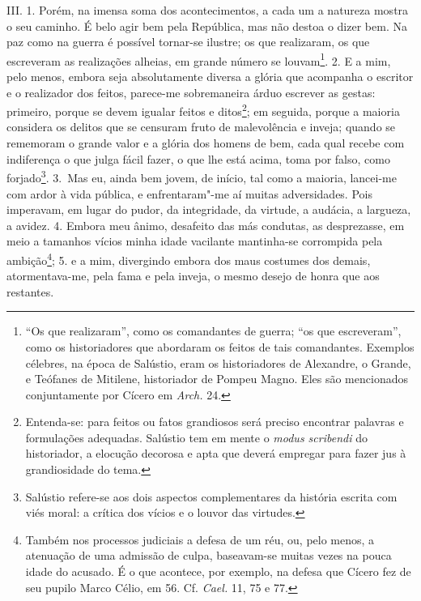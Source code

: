 III. 1. Porém, na imensa soma dos acontecimentos, a cada um a natureza mostra o
seu caminho. É belo agir bem pela República, mas não destoa o dizer bem. Na paz
como na guerra é possível tornar-se ilustre; os que realizaram, os que
escreveram as realizações alheias, em grande número se louvam\footnote{``Os que
realizaram'', como os comandantes de guerra; ``os que escreveram'', como os
historiadores que abordaram os feitos de tais comandantes. Exemplos célebres,
na época de Salústio, eram os historiadores de Alexandre, o Grande, e Teófanes
de Mitilene, historiador de Pompeu Magno. Eles são mencionados conjuntamente
por Cícero em \emph{Arch.} 24.}. 2. E a mim, pelo menos, embora
seja absolutamente diversa a glória que acompanha o escritor e o realizador dos
feitos, parece-me sobremaneira árduo escrever as gestas: primeiro, porque se
devem igualar feitos e ditos\footnote{Entenda-se: para feitos ou fatos
grandiosos será preciso encontrar palavras e formulações adequadas. Salústio tem em mente o
\emph{modus scribendi} do historiador, a elocução decorosa e apta que deverá
empregar para fazer jus à grandiosidade do tema.}; em seguida, porque a maioria
considera os delitos que se censuram fruto de malevolência e inveja; quando se
rememoram o grande valor e a glória dos homens de bem, cada qual recebe com
indiferença o que julga fácil fazer, o que lhe está acima, toma por falso, como
forjado\footnote{Salústio refere-se aos dois aspectos complementares da
história escrita com viés moral: a crítica dos vícios e o louvor das
virtudes.}. 3.~Mas eu, ainda bem jovem, de início, tal como a maioria,
lancei-me com ardor à vida pública, e enfrentaram"-me aí muitas adversidades.
Pois imperavam, em lugar do pudor, da integridade, da virtude, a audácia, a
largueza, a avidez. 4. Embora meu ânimo, desafeito das más condutas, as
desprezasse, em meio a tamanhos vícios minha idade vacilante mantinha-se corrompida pela ambição\footnote{Também
nos processos judiciais a defesa de um réu, ou, pelo menos, a atenuação de uma
admissão de culpa, baseavam-se muitas vezes na pouca idade do acusado. É o que
acontece, por exemplo, na defesa que Cícero fez de seu pupilo Marco Célio, em
56. Cf. \emph{Cael.} 11, 75 e 77.}; 5. e a mim, divergindo embora dos
maus costumes dos demais, atormentava-me, pela fama e pela inveja, o mesmo
desejo de honra que aos restantes.

